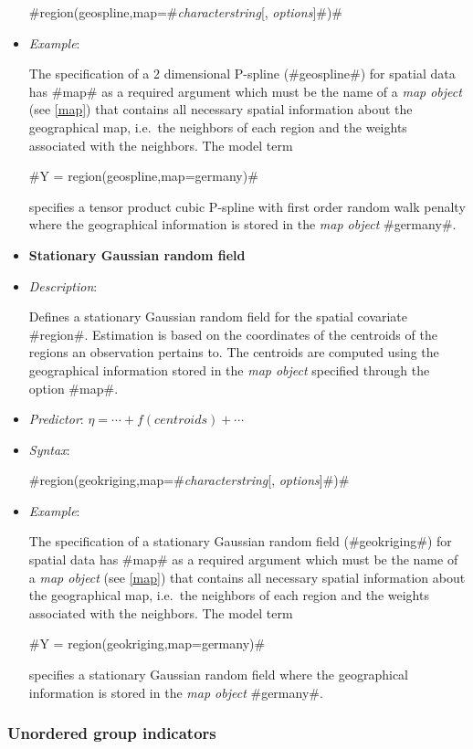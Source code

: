 \begin{itemize}
#region(geospline,map=#{\em characterstring}[, {\em options}]#)#
\item[] {\em Example}:

The specification of a 2 dimensional P-spline  (#geospline#) for
spatial data has #map# as a required argument which must be the
name of a {\em map object} (see \autoref{map}) that contains all
necessary spatial information about the geographical map, i.e.~the
neighbors of each region and the weights associated with the
neighbors. The model term

#Y = region(geospline,map=germany)#

specifies a tensor product cubic P-spline with first order random
walk penalty where the geographical information is stored in the
{\em map object} #germany#.

\item[]{\bf\sffamily Stationary Gaussian random field}

\item[] {\em Description}:

Defines a stationary Gaussian random field for the spatial covariate
#region#. Estimation is based on the coordinates of the centroids of
the regions an observation pertains to. The centroids are computed
using the geographical information stored in the {\em map object}
specified through the option #map#.
\item[] {\em Predictor}: $\eta= \cdots + f(centroids) + \cdots$
\item[] {\em Syntax}:

#region(geokriging,map=#{\em characterstring}[, {\em options}]#)#
\item[] {\em Example}:

The specification of a stationary Gaussian random field
(#geokriging#) for spatial data has #map# as a required argument
which must be the name of a {\em map object} (see \autoref{map})
that contains all necessary spatial information about the
geographical map, i.e.~the neighbors of each region and the weights
associated with the neighbors. The model term

#Y = region(geokriging,map=germany)#

specifies a stationary Gaussian random field where the geographical
information is stored in the {\em map object} #germany#.
\end{itemize}

\subsubsection*{Unordered group indicators}

